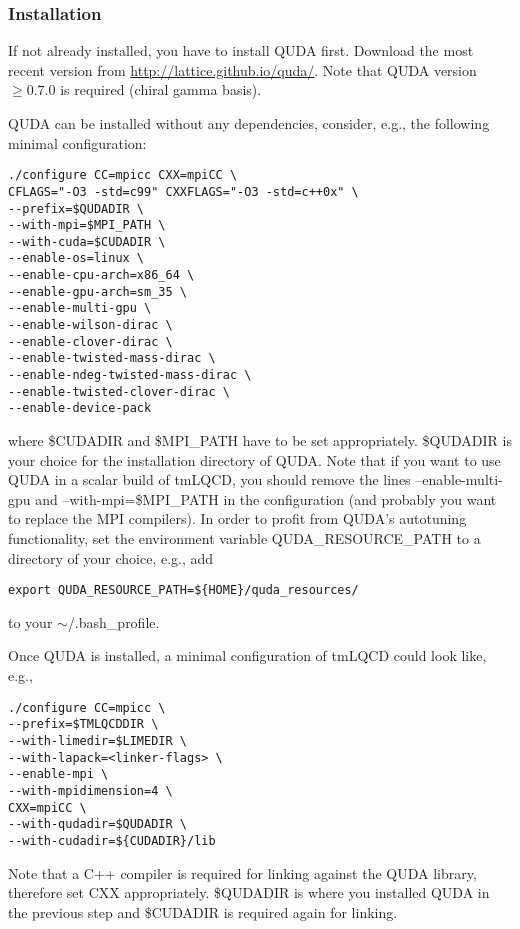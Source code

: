 \subsubsection{Installation}
If not already installed, you have to install QUDA first. Download the most recent version from \url{http://lattice.github.io/quda/}. Note that QUDA version $\geq 0.7.0$ is required (chiral gamma basis).

QUDA can be installed without any dependencies, consider, e.g., the following minimal configuration:

\begin{verbatim}
./configure CC=mpicc CXX=mpiCC \
CFLAGS="-O3 -std=c99" CXXFLAGS="-O3 -std=c++0x" \
--prefix=$QUDADIR \
--with-mpi=$MPI_PATH \
--with-cuda=$CUDADIR \
--enable-os=linux \
--enable-cpu-arch=x86_64 \
--enable-gpu-arch=sm_35 \
--enable-multi-gpu \
--enable-wilson-dirac \
--enable-clover-dirac \
--enable-twisted-mass-dirac \
--enable-ndeg-twisted-mass-dirac \
--enable-twisted-clover-dirac \
--enable-device-pack
\end{verbatim}
where {\ttfamily \$CUDADIR} and {\ttfamily \$MPI\_PATH} have to be set appropriately.
{\ttfamily \$QUDADIR} is your choice for the installation directory of QUDA.
Note that if you want to use QUDA in a scalar build of tmLQCD, you should remove the lines {\ttfamily --enable-multi-gpu} and {\ttfamily --with-mpi=\$MPI\_PATH} in the configuration (and probably you want to replace the MPI compilers).
In order to profit from QUDA's autotuning functionality, set the environment variable {\ttfamily QUDA\_RESOURCE\_PATH} to a directory of your choice, e.g., add
\begin{verbatim}
export QUDA_RESOURCE_PATH=${HOME}/quda_resources/
\end{verbatim}
to your {\ttfamily $\sim$/.bash\_profile}.

Once QUDA is installed, a minimal configuration of tmLQCD could look like, e.g.,
\begin{verbatim}
./configure CC=mpicc \
--prefix=$TMLQCDDIR \
--with-limedir=$LIMEDIR \
--with-lapack=<linker-flags> \
--enable-mpi \
--with-mpidimension=4 \
CXX=mpiCC \
--with-qudadir=$QUDADIR \
--with-cudadir=${CUDADIR}/lib
\end{verbatim}
Note that a {\ttfamily C++} compiler is required for linking against the QUDA library, therefore set {\ttfamily CXX} appropriately. {\ttfamily \${QUDADIR}} is where you installed QUDA in the previous step and {\ttfamily \${CUDADIR}} is required again for linking.



